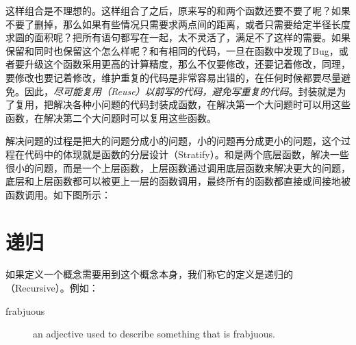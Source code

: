 这样组合是不理想的。这样组合了之后，原来写的和两个函数还要不要了呢？如果不要了删掉，那么如果有些情况只需要求两点间的距离，或者只需要给定半径长度求圆的面积呢？把所有语句都写在一起，太不灵活了，满足不了这样的需要。如果保留和同时也保留这个怎么样呢？和有相同的代码，一旦在函数中发现了Bug，或者要升级这个函数采用更高的计算精度，那么不仅要修改，还要记着修改，同理，要修改也要记着修改，维护重复的代码是非常容易出错的，在任何时候都要尽量避免。因此，\emph{尽可能复用（Reuse）以前写的代码，避免写重复的代码}。封装就是为了复用，把解决各种小问题的代码封装成函数，在解决第一个大问题时可以用这些函数，在解决第二个大问题时可以复用这些函数。



解决问题的过程是把大的问题分成小的问题，小的问题再分成更小的问题，这个过程在代码中的体现就是函数的分层设计（Stratify）。和是两个底层函数，解决一些很小的问题，而是一个上层函数，上层函数通过调用底层函数来解决更大的问题，底层和上层函数都可以被更上一层的函数调用，最终所有的函数都直接或间接地被函数调用。如下图所示：






\section{递归}
%
如果定义一个概念需要用到这个概念本身，我们称它的定义是递归的（Recursive）。例如：


\begin{description}
\item[{frabjuous}]


an adjective used to describe something that is frabjuous.\BookSplit{}


\end{description}


